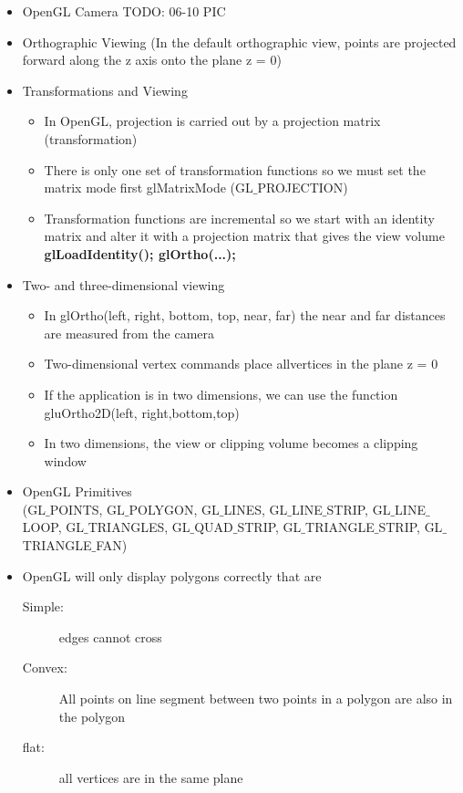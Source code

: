 \documentclass[11pt,a4paper]{article}
\begin{document}
\begin{itemize}
\begin{itemize}
				\end{itemize}
			\item OpenGL Camera TODO: 06-10 PIC
			\item Orthographic Viewing (In the default orthographic view, points are projected forward along the z axis onto the plane z = 0)
			\item Transformations and Viewing
				\begin{itemize}
					\item In OpenGL, projection is carried out by a projection matrix (transformation)	
					\item There is only one set of transformation functions so we must set the matrix mode first glMatrixMode (GL$\_$PROJECTION)	
					\item Transformation functions are incremental so we start with	an identity matrix and alter it with a projection matrix that gives the view volume \textbf{glLoadIdentity(); glOrtho(...);}
				\end{itemize}
			\item Two- and three-dimensional viewing
				\begin{itemize}
					\item In glOrtho(left, right, bottom, top, near, far) the near and far distances are measured from the camera	
					\item Two-dimensional vertex commands place allvertices in the plane z = 0	
					\item If the application is in two dimensions, we can use the function gluOrtho2D(left, right,bottom,top)	
					\item In two dimensions, the view or clipping volume becomes a clipping window
				\end{itemize}
			\item OpenGL Primitives\\
			(GL$\_$POINTS,
			GL$\_$POLYGON,
			GL$\_$LINES,
			GL$\_$LINE$\_$STRIP,
			GL$\_$LINE$\_$LOOP,
			GL$\_$TRIANGLES,
			GL$\_$QUAD$\_$STRIP,
			GL$\_$TRIANGLE$\_$STRIP,
			GL$\_$TRIANGLE$\_$FAN)
			\item OpenGL will only display polygons correctly that are	
				\begin{description}
					\item[Simple:] edges cannot cross
					\item[Convex:] All points on line segment between two points in a polygon are also in the polygon	
					\item[flat:] all vertices are in the same plane
				\end{description}

\end{itemize}
\end{document}
